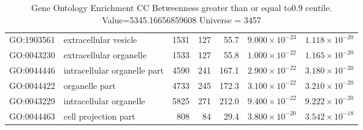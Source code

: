 \begin{table}[ht]
\begin{tabular}{llrrrrr}
  GO:1903561 & extracellular vesicle & 1531 & 127 & 55.7 & $9.000 \times 10^{-23}$ & $1.118 \times 10^{-20}$ \\ 
  GO:0043230 & extracellular organelle & 1533 & 127 & 55.8 & $1.000 \times 10^{-22}$ & $1.165 \times 10^{-20}$ \\ 
  GO:0044446 & intracellular organelle part & 4590 & 241 & 167.1 & $2.900 \times 10^{-22}$ & $3.180 \times 10^{-20}$ \\ 
  GO:0044422 & organelle part & 4733 & 245 & 172.3 & $3.100 \times 10^{-22}$ & $3.210 \times 10^{-20}$ \\ 
  GO:0043229 & intracellular organelle & 5825 & 271 & 212.0 & $9.400 \times 10^{-22}$ & $9.222 \times 10^{-20}$ \\ 
  GO:0044463 & cell projection part & 808 & 84 & 29.4 & $3.800 \times 10^{-20}$ & $3.542 \times 10^{-18}$ \\ 
   \hline
\end{tabular}
\caption{Gene Ontology Enrichment CC Betweenness  greater than or equal to0.9 centile.   Value=5345.16656859608 Universe = 3457} 
\label{tab:Gene Ontology Enrichment CC Betweenness  greater than or equal to0.9 centile.   Value=5345.16656859608 Universe = 3457}
\end{table}

